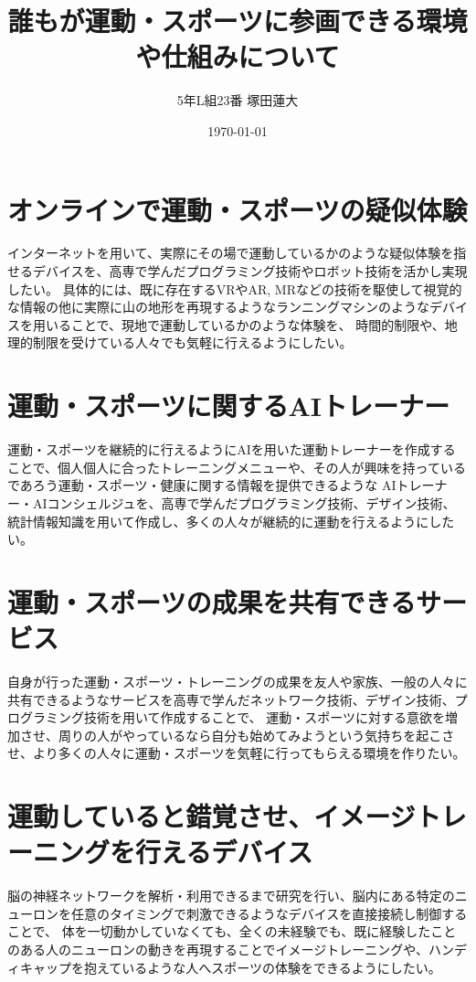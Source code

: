 \documentclass[a4j,uplatex]{jsarticle}
\title{誰もが運動・スポーツに参画できる環境や仕組みについて}
\author{5年L組23番 塚田蓮大}
\date{\today}
\numberwithin{equation}{section}
\begin{document}
	\maketitle

	\section{オンラインで運動・スポーツの疑似体験}
		インターネットを用いて、実際にその場で運動しているかのような疑似体験を指せるデバイスを、高専で学んだプログラミング技術やロボット技術を活かし実現したい。
		具体的には、既に存在するVRやAR, MRなどの技術を駆使して視覚的な情報の他に実際に山の地形を再現するようなランニングマシンのようなデバイスを用いることで、現地で運動しているかのような体験を、
		時間的制限や、地理的制限を受けている人々でも気軽に行えるようにしたい。
	\section{運動・スポーツに関するAIトレーナー}
		運動・スポーツを継続的に行えるようにAIを用いた運動トレーナーを作成することで、個人個人に合ったトレーニングメニューや、その人が興味を持っているであろう運動・スポーツ・健康に関する情報を提供できるような
		AIトレーナー・AIコンシェルジュを、高専で学んだプログラミング技術、デザイン技術、統計情報知識を用いて作成し、多くの人々が継続的に運動を行えるようにしたい。
	\section{運動・スポーツの成果を共有できるサービス}
		自身が行った運動・スポーツ・トレーニングの成果を友人や家族、一般の人々に共有できるようなサービスを高専で学んだネットワーク技術、デザイン技術、プログラミング技術を用いて作成することで、
		運動・スポーツに対する意欲を増加させ、周りの人がやっているなら自分も始めてみようという気持ちを起こさせ、より多くの人々に運動・スポーツを気軽に行ってもらえる環境を作りたい。
	\section{運動していると錯覚させ、イメージトレーニングを行えるデバイス}
		脳の神経ネットワークを解析・利用できるまで研究を行い、脳内にある特定のニューロンを任意のタイミングで刺激できるようなデバイスを直接接続し制御することで、
		体を一切動かしていなくても、全くの未経験でも、既に経験したことのある人のニューロンの動きを再現することでイメージトレーニングや、ハンディキャップを抱えているような人へスポーツの体験をできるようにしたい。
\end{document}
